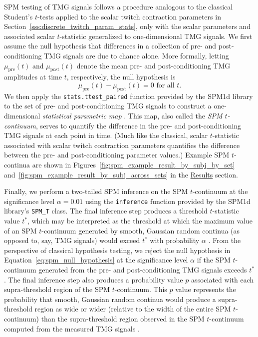 \documentclass[utf8]{FrontiersinHarvard}
\begin{document}
SPM testing of TMG signals follows a procedure analogous to the classical Student's $ t $-tests applied to the scalar twitch contraction parameters in Section~\ref{sss:discrete_twitch_param_stats}, only with the scalar parameters and associated scalar $ t $-statistic generalized to one-dimensional TMG signals.
We first assume the null hypothesis that differences in a collection of pre- and post-conditioning TMG signals are due to chance alone.
More formally, letting $ \mu_{\mathrm{pre}}(t) $ and $ \mu_{\mathrm{post}}(t) $ denote the mean pre- and post-conditioning TMG amplitudes at time $ t $, respectively, the null hypothesis is
\begin{equation}
    \mu_{\text{pre}}(t) - \mu_{\text{post}} (t) = 0 \text{ for all } t. \label{eq:spm_null_hypothesis}
\end{equation}
We then apply the \texttt{stats.ttest\_paired} function provided by the SPM1d library to the set of pre- and post-conditioning TMG signals to construct a one-dimensional \textit{statistical parametric map} \citep{pataky-spm1d}.
This map, also called the \textit{SPM $ t $-continuum}, serves to quantify the difference in the pre- and post-conditioning TMG signals at each point in time.
(Much like the classical, scalar $ t $-statistic associated with scalar twitch contraction parameters quantifies the difference between the pre- and post-conditioning parameter values.)
Example SPM $ t $-continua are shown in Figures~\ref{fig:spm_example_result_by_subj_by_set} and~\ref{fig:spm_example_result_by_subj_across_sets} in the \hyperref[s:results]{Results} section.

Finally, we perform a two-tailed SPM inference on the SPM $ t $-continuum at the significance level $ \alpha = 0.01 $ using the \texttt{inference} function provided by the SPM1d library's \texttt{SPM\_T} class.
The final inference step produces a threshold $ t $-statistic value $ t^{*} $, which may be interpreted as the threshold at which the maximum value of an SPM $ t $-continuum generated by smooth, Gaussian random continua (as opposed to, say, TMG signals) would exceed $ t^{*} $ with probability $ \alpha $ \citep{pataky-spm1d}.
From the perspective of classical hypothesis testing, we reject the null hypothesis in Equation~\ref{eq:spm_null_hypothesis} at the significance level $ \alpha $ if the SPM $ t $-continuum generated from the pre- and post-conditioning TMG signals exceeds $ t^{*} $.
The final inference step also produces a probability value $ p $ associated with each supra-threshold region of the SPM $ t $-continuum.
This $ p $ value represents the probability that smooth, Gaussian random continua would produce a supra-threshold region as wide or wider (relative to the width of the entire SPM $ t $-continuum) than the supra-threshold region observed in the SPM $ t $-continuum computed from the measured TMG signals \citep{pataky-spm1d}.
\end{document}
